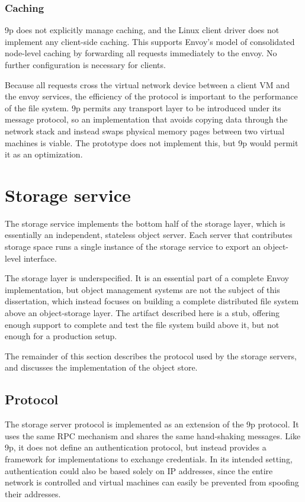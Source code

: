 \subsubsection{Caching}

9p does not explicitly manage caching, and the Linux client driver does not implement any client-side caching. This supports Envoy's model of consolidated node-level caching by forwarding all requests immediately to the envoy. No further configuration is necessary for clients.

Because all requests cross the virtual network device between a client VM and the envoy services, the efficiency of the protocol is important to the performance of the file system. 9p permits any transport layer to be introduced under its message protocol, so an implementation that avoids copying data through the network stack and instead swaps physical memory pages between two virtual machines is viable. The prototype does not implement this, but 9p would permit it as an optimization.

\section{Storage service}

The storage service implements the bottom half of the storage layer, which is essentially an independent, stateless object server. Each server that contributes storage space runs a single instance of the storage service to export an object-level interface.

The storage layer is underspecified. It is an essential part of a complete Envoy implementation, but object management systems are not the subject of this dissertation, which instead focuses on building a complete distributed file system above an object-storage layer. The artifact described here is a stub, offering enough support to complete and test the file system build above it, but not enough for a production setup.

The remainder of this section describes the protocol used by the storage servers, and discusses the implementation of the object store.

\subsection{Protocol}

The storage server protocol is implemented as an extension of the 9p protocol. It uses the same RPC mechanism and shares the same hand-shaking messages. Like 9p, it does not define an authentication protocol, but instead provides a framework for implementations to exchange credentials. In its intended setting, authentication could also be based solely on IP addresses, since the entire network is controlled and virtual machines can easily be prevented from spoofing their addresses.

